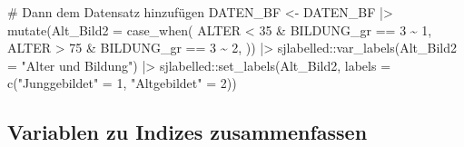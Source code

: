 \documentclass[twoside, pagesize, fontsize=11pt, dvipsnames]{scrreport}
\newenvironment{Shaded}{\begin{snugshade}}{\end{snugshade}}
\newcommand{\AttributeTok}[1]{\textcolor[rgb]{0.40,0.45,0.13}{#1}}
\newcommand{\CommentTok}[1]{\textcolor[rgb]{0.37,0.37,0.37}{#1}}
\newcommand{\DecValTok}[1]{\textcolor[rgb]{0.68,0.00,0.00}{#1}}
\newcommand{\FunctionTok}[1]{\textcolor[rgb]{0.28,0.35,0.67}{#1}}
\newcommand{\NormalTok}[1]{\textcolor[rgb]{0.00,0.23,0.31}{#1}}
\newcommand{\OtherTok}[1]{\textcolor[rgb]{0.00,0.23,0.31}{#1}}
\newcommand{\SpecialCharTok}[1]{\textcolor[rgb]{0.37,0.37,0.37}{#1}}
\newcommand{\StringTok}[1]{\textcolor[rgb]{0.13,0.47,0.30}{#1}}
\begin{document}
\begin{Shaded}
\begin{Highlighting}[]
\CommentTok{\# Dann dem Datensatz hinzufügen}
\NormalTok{DATEN\_BF }\OtherTok{\textless{}{-}}\NormalTok{ DATEN\_BF }\SpecialCharTok{|\textgreater{}} 
  \FunctionTok{mutate}\NormalTok{(}\AttributeTok{Alt\_Bild2 =} \FunctionTok{case\_when}\NormalTok{(}
\NormalTok{    ALTER }\SpecialCharTok{\textless{}} \DecValTok{35} \SpecialCharTok{\&}\NormalTok{ BILDUNG\_gr }\SpecialCharTok{==} \DecValTok{3} \SpecialCharTok{\textasciitilde{}} \DecValTok{1}\NormalTok{, }
\NormalTok{    ALTER }\SpecialCharTok{\textgreater{}} \DecValTok{75} \SpecialCharTok{\&}\NormalTok{ BILDUNG\_gr }\SpecialCharTok{==} \DecValTok{3} \SpecialCharTok{\textasciitilde{}} \DecValTok{2}\NormalTok{,}
\NormalTok{  )) }\SpecialCharTok{|\textgreater{}} 
\NormalTok{  sjlabelled}\SpecialCharTok{::}\FunctionTok{var\_labels}\NormalTok{(}\AttributeTok{Alt\_Bild2 =} \StringTok{"Alter und Bildung"}\NormalTok{) }\SpecialCharTok{|\textgreater{}} 
\NormalTok{  sjlabelled}\SpecialCharTok{::}\FunctionTok{set\_labels}\NormalTok{(Alt\_Bild2, }\AttributeTok{labels =} \FunctionTok{c}\NormalTok{(}\StringTok{"Junggebildet"} \OtherTok{=} \DecValTok{1}\NormalTok{, }\StringTok{"Altgebildet"} \OtherTok{=} \DecValTok{2}\NormalTok{))}
\end{Highlighting}
\end{Shaded}

\hypertarget{variablen-zu-indizes-zusammenfassen}{%
\subsection{Variablen zu Indizes
zusammenfassen}\label{variablen-zu-indizes-zusammenfassen}}
\end{document}
